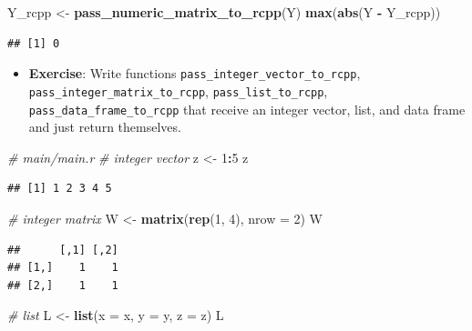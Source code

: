 \documentclass[]{book}
\newenvironment{Shaded}{\begin{snugshade}}{\end{snugshade}}
\newcommand{\KeywordTok}[1]{\textcolor[rgb]{0.13,0.29,0.53}{\textbf{#1}}}
\newcommand{\DataTypeTok}[1]{\textcolor[rgb]{0.13,0.29,0.53}{#1}}
\newcommand{\DecValTok}[1]{\textcolor[rgb]{0.00,0.00,0.81}{#1}}
\newcommand{\StringTok}[1]{\textcolor[rgb]{0.31,0.60,0.02}{#1}}
\newcommand{\CommentTok}[1]{\textcolor[rgb]{0.56,0.35,0.01}{\textit{#1}}}
\newcommand{\OperatorTok}[1]{\textcolor[rgb]{0.81,0.36,0.00}{\textbf{#1}}}
\newcommand{\NormalTok}[1]{#1}
\providecommand{\tightlist}{%
  \setlength{\itemsep}{0pt}\setlength{\parskip}{0pt}}
\begin{document}
\begin{Shaded}
\begin{Highlighting}[]
\NormalTok{Y_rcpp <-}\StringTok{ }\KeywordTok{pass_numeric_matrix_to_rcpp}\NormalTok{(Y)}
\KeywordTok{max}\NormalTok{(}\KeywordTok{abs}\NormalTok{(Y }\OperatorTok{-}\StringTok{ }\NormalTok{Y_rcpp))}
\end{Highlighting}
\end{Shaded}

\begin{verbatim}
## [1] 0
\end{verbatim}

\begin{itemize}
\tightlist
\item
  \textbf{Exercise}: Write functions
  \texttt{pass\_integer\_vector\_to\_rcpp},
  \texttt{pass\_integer\_matrix\_to\_rcpp},
  \texttt{pass\_list\_to\_rcpp}, \texttt{pass\_data\_frame\_to\_rcpp}
  that receive an integer vector, list, and data frame and just return
  themselves.
\end{itemize}

\begin{Shaded}
\begin{Highlighting}[]
\CommentTok{# main/main.r}
\CommentTok{# integer vector}
\NormalTok{z <-}\StringTok{ }\DecValTok{1}\OperatorTok{:}\DecValTok{5}
\NormalTok{z}
\end{Highlighting}
\end{Shaded}

\begin{verbatim}
## [1] 1 2 3 4 5
\end{verbatim}

\begin{Shaded}
\begin{Highlighting}[]
\CommentTok{# integer matrix}
\NormalTok{W <-}\StringTok{ }\KeywordTok{matrix}\NormalTok{(}\KeywordTok{rep}\NormalTok{(}\DecValTok{1}\NormalTok{, }\DecValTok{4}\NormalTok{), }\DataTypeTok{nrow =} \DecValTok{2}\NormalTok{)}
\NormalTok{W}
\end{Highlighting}
\end{Shaded}

\begin{verbatim}
##      [,1] [,2]
## [1,]    1    1
## [2,]    1    1
\end{verbatim}

\begin{Shaded}
\begin{Highlighting}[]
\CommentTok{# list}
\NormalTok{L <-}\StringTok{ }\KeywordTok{list}\NormalTok{(}\DataTypeTok{x =}\NormalTok{ x, }\DataTypeTok{y =}\NormalTok{ y, }\DataTypeTok{z =}\NormalTok{ z)}
\NormalTok{L}
\end{Highlighting}
\end{Shaded}
\end{document}
